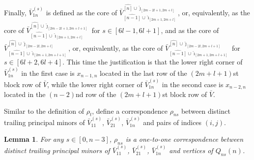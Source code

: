 \documentclass{amsart}
\newtheorem{lemma}[theorem]{Lemma}
\theoremstyle{definition}
\theoremstyle{remark}
\numberwithin{equation}{section}
\numberwithin{theorem}{section}
\begin{document}
Finally, $\bar V_{1n}^{(s)}$ is defined as the core of 
$\bar V^{\widehat{[n]}\cup \hat\jmath_{[2m-2l+1,2m+l]}}_{\widehat{[n-1]}\cup \hat \imath_{[2m+1,2m+l]}}$, or, equivalently,
as the core of  
$\bar V^{\widehat{[n]}\cup \hat\jmath_{[2m-2l+1,2m+l+1]}}_{\widehat{[n-1]}\cup \hat \imath_{[2m+1,2m+l]}}$ 
 for $s\in[6l-1,6l+1]$, and as the core of
 $\bar V^{\widehat{[n]}\cup \hat\jmath_{[2m-2l,2m+l]}}_{\widehat{[n-1]}\cup \hat \imath_{[2m+1,2m+l+1]}}$, or, equivalently, as the core of 
$\bar V^{\widehat{[n]}\cup \hat\jmath_{[2m-2l,2m+l+1]}}_{\widehat{[n-1]}\cup \hat \imath_{[2m+1,2m+l+1]}}$
 for $s\in[6l+2,6l+4]$. This time the justification is that the lower right corner of $\bar V_{1n}^{(s)}$ 
in the first case is $x_{n-1,n}$ located in the last row of the $(2m+l+1)$st block row of $\bar V$, while the lower right corner of $\bar V_{1n}^{(s)}$ in the second case  is $x_{n-2,n}$ located in the $(n-2)$nd  row of the $(2m+l+1)$st block row of $\bar V$. 

Similar to the definition of $\rho_t$, define
a correspondence $\rho_{ns}$ between distinct trailing principal minors  of  $\bar
V_{11}^{(s)}$,  $\bar V_{21}^{(s)}$, $\bar  V_{1n}^{(s)}$ and pairs of indices $(i,j)$.

\begin{lemma}
\label{rho_ns}
For any $s\in [0,n-3]$, 
$\rho_{ns}$ is a one-to-one correspondence between distinct trailing principal
minors  of  $\bar V_{11}^{(s)}$, $\bar V_{21}^{(s)}$, $\bar  V_{1n}^{(s)}$ and vertices
of $Q_{ns}(n)$.
\end{lemma}
\end{document}
